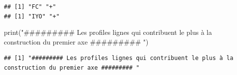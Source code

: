 \documentclass[
]{article}
\newenvironment{Shaded}{\begin{snugshade}}{\end{snugshade}}
\newcommand{\AttributeTok}[1]{\textcolor[rgb]{0.77,0.63,0.00}{#1}}
\newcommand{\ControlFlowTok}[1]{\textcolor[rgb]{0.13,0.29,0.53}{\textbf{#1}}}
\newcommand{\DecValTok}[1]{\textcolor[rgb]{0.00,0.00,0.81}{#1}}
\newcommand{\FunctionTok}[1]{\textcolor[rgb]{0.00,0.00,0.00}{#1}}
\newcommand{\NormalTok}[1]{#1}
\newcommand{\OtherTok}[1]{\textcolor[rgb]{0.56,0.35,0.01}{#1}}
\newcommand{\SpecialCharTok}[1]{\textcolor[rgb]{0.00,0.00,0.00}{#1}}
\newcommand{\StringTok}[1]{\textcolor[rgb]{0.31,0.60,0.02}{#1}}
\begin{document}
\begin{verbatim}
## [1] "FC" "+" 
## [1] "IYO" "+"
\end{verbatim}

\begin{Shaded}
\begin{Highlighting}[]
\FunctionTok{print}\NormalTok{(}\StringTok{"\#\#\#\#\#\#\#\#\# Les profiles lignes qui contribuent le plus à la construction du premier axe \#\#\#\#\#\#\#\#\# "}\NormalTok{)}
\end{Highlighting}
\end{Shaded}

\begin{verbatim}
## [1] "######### Les profiles lignes qui contribuent le plus à la construction du premier axe ######### "
\end{verbatim}

\begin{Shaded}
\end{Shaded}
\end{document}
